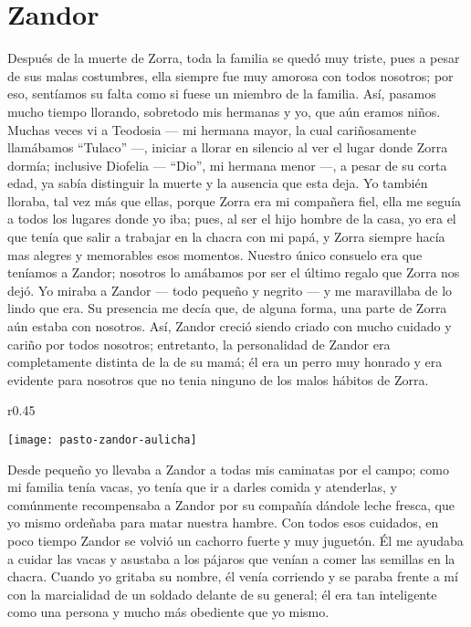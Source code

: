 \cleardoublepage
\newpage
\ifdefined\EnableIncludeImages
\fi
\chapter{Zandor}
Después de la muerte de Zorra, toda la familia se quedó muy triste, pues a pesar de sus malas costumbres, ella siempre fue muy amorosa con todos nosotros; por eso, sentíamos su falta como si fuese un miembro de la familia.
Así, pasamos mucho tiempo llorando, sobretodo mis hermanas y yo, que aún eramos niños.
Muchas veces vi a Teodosia --- mi hermana mayor, la cual cariñosamente llamábamos ``Tulaco'' ---, iniciar a llorar en silencio al ver el lugar donde Zorra dormía; inclusive Diofelia --- ``Dio'', mi hermana menor ---, a pesar de su corta edad, ya sabía distinguir la muerte y la ausencia que esta deja.
Yo también lloraba, tal vez más que ellas, porque Zorra era mi compañera fiel, ella me seguía a todos los lugares donde yo iba; pues, al ser el hijo hombre de la casa, yo era el que tenía que salir a trabajar en la chacra con mi papá, y Zorra siempre hacía mas alegres y memorables esos momentos.
Nuestro único consuelo era que teníamos a Zandor; nosotros lo amábamos por ser el último regalo que Zorra nos dejó.
Yo miraba a Zandor --- todo pequeño y negrito --- y me maravillaba de lo lindo que era. Su presencia me decía que, de alguna forma, una parte de Zorra aún estaba con nosotros.
Así, Zandor creció siendo criado con mucho cuidado y cariño por todos nosotros;
entretanto, la personalidad de Zandor era completamente distinta de la de su mamá; él era un perro muy honrado y era evidente para nosotros que no tenia ninguno de los malos hábitos de Zorra.
\ifdefined\EnableIncludeImages
\begin{wrapfigure}{r}{0.45\textwidth}
  \begin{center}
  \vspace{-20pt}
    \texttt{[image: pasto-zandor-aulicha]}
  \end{center}
  \vspace{-20pt}
\end{wrapfigure}
\fi
Desde pequeño yo llevaba a Zandor a todas mis caminatas por el campo; como mi familia tenía vacas, yo tenía que ir a darles comida y atenderlas, y comúnmente recompensaba a Zandor por su compañía dándole leche fresca, que yo mismo ordeñaba para matar nuestra hambre.
Con todos esos cuidados, en poco tiempo Zandor se volvió un cachorro fuerte y muy juguetón.
Él me ayudaba a cuidar las vacas y asustaba a los pájaros que venían a comer las semillas en la chacra. Cuando yo gritaba su nombre, él venía corriendo y se paraba frente a mí con la marcialidad de un soldado delante de su general; él era tan inteligente como una persona y mucho más obediente que yo mismo.

